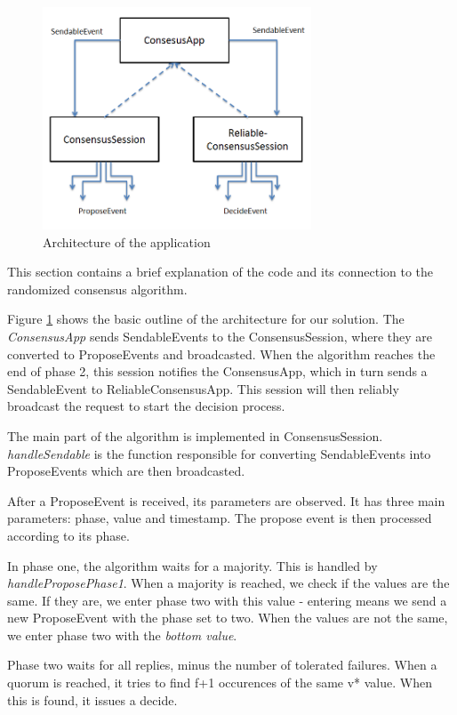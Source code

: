 \documentclass[times, 12pt,twocolumn]{article}
\begin{document}

\begin{figure}[ht!]
\centering
\includegraphics[width=80mm]{arch.png}
\caption{Architecture of the application}
\label{fig:arch}
\end{figure}

This section contains a brief explanation of the code and its connection 
to the randomized consensus algorithm.
 
Figure \ref{fig:arch} shows the basic outline of the architecture for our 
solution. The \textit{ConsensusApp} sends SendableEvents to the ConsensusSession, 
where they are converted to ProposeEvents and broadcasted. When the algorithm 
reaches the end of phase 2, this session notifies the ConsensusApp, which in turn 
sends a SendableEvent to ReliableConsensusApp. This session will then reliably 
broadcast the request to start the decision process.

The main part of the algorithm is implemented in ConsensusSession. 
\textit{handleSendable} is the function responsible for converting SendableEvents 
into ProposeEvents which are then broadcasted.

After a ProposeEvent is received, its parameters are observed. It has three main 
parameters: phase, value and timestamp. The propose event is then processed according 
to its phase.

In phase one, the algorithm waits for a majority. This is handled by 
\textit{handleProposePhase1}. When a majority is reached, we check if the values 
are the same. If they are, we enter phase two with this value - entering means 
we send a new ProposeEvent with the phase set to two. When the values are not the 
same, we enter phase two with the \textit{bottom value}.

Phase two waits for all replies, minus the number of tolerated failures. 
When a quorum is reached, it tries to find f+1 occurences of the same v* value. 
When this is found, it issues a decide.
\end{document}
